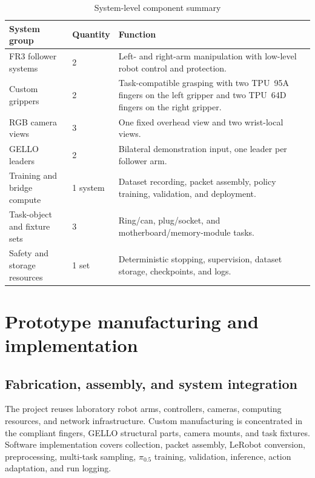 \begin{table}[htbp]
  \centering
  \caption{System-level component summary}
  \label{tab:ch4-system-component-summary}
  \small
  \begin{tabularx}{\textwidth}{p{}p{}X}
    \toprule
    \textbf{System group} & \textbf{Quantity} & \textbf{Function} \\
    \midrule
    FR3 follower systems & 2 & Left- and right-arm manipulation with low-level robot control and protection. \\
    Custom grippers & 2 & Task-compatible grasping with two TPU~95A fingers on the left gripper and two TPU~64D fingers on the right gripper. \\
    RGB camera views & 3 & One fixed overhead view and two wrist-local views. \\
    GELLO leaders & 2 & Bilateral demonstration input, one leader per follower arm. \\
    Training and bridge compute & 1 system & Dataset recording, packet assembly, policy training, validation, and deployment. \\
    Task-object and fixture sets & 3 & Ring/can, plug/socket, and motherboard/memory-module tasks. \\
    Safety and storage resources & 1 set & Deterministic stopping, supervision, dataset storage, checkpoints, and logs. \\
    \bottomrule
  \end{tabularx}
\end{table}

\section{Prototype manufacturing and implementation}

\subsection{Fabrication, assembly, and system integration}

The project reuses laboratory robot arms, controllers, cameras, computing resources, and network infrastructure. Custom manufacturing is concentrated in the compliant fingers, GELLO structural parts, camera mounts, and task fixtures. Software implementation covers collection, packet assembly, LeRobot conversion, preprocessing, multi-task sampling, $\pi_{0.5}$ training, validation, inference, action adaptation, and run logging.

